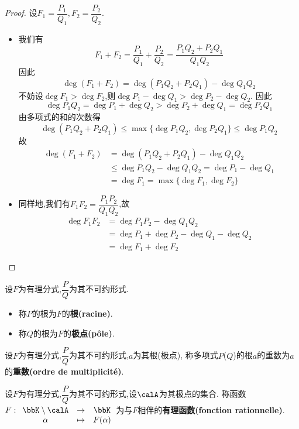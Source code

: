 \begin{proof}
    设$F_1 = \dfrac{P_1}{Q_1}, F_2 = \dfrac{P_2}{Q_2}$.
    \begin{itemize}
        \item 我们有\[ F_1 + F_2 = \dfrac{P_1}{Q_1} + \dfrac{P_2}{Q_2} = \dfrac{P_1Q_2 + P_2Q_1}{Q_1Q_2} \]
            因此\[ \deg (F_1 + F_2) = \deg (P_1Q_2 + P_2Q_1) - \deg Q_1Q_2 \]
            不妨设$\deg F_1 > \deg F_2$,则$\deg P_1 - \deg Q_1 > \deg P_2 - \deg Q_2$.
            因此\[ \deg P_1Q_2 = \deg P_1 + \deg Q_2 > \deg P_2 + \deg Q_1 = \deg P_2Q_1 \]
            由多项式的和的次数得\[ \deg (P_1Q_2 + P_2Q_1) \leqslant \max \{ \deg P_1Q_2, \deg P_2Q_1 \} \leqslant \deg P_1Q_2 \]
            故\begin{align*}
                \deg (F_1 + F_2) & =\deg (P_1Q_2 + P_2Q_1) - \deg Q_1Q_2 \\
                & \leqslant \deg P_1Q_2 - \deg Q_1Q_2 = \deg P_1 - \deg Q_1 \\
                & = \deg F_1 = \max \{ \deg F_1, \deg F_2 \}
            \end{align*}
        \item 同样地,我们有$F_1F_2 = \dfrac{P_1P_2}{Q_1Q_2}$,故
            \begin{align*}
                \deg F_1F_2 & = \deg P_1P_2 - \deg Q_1Q_2 \\
                & = \deg P_1 + \deg P_2 - \deg Q_1 - \deg Q_2 \\
                & = \deg F_1 + \deg F_2
            \end{align*}
    \end{itemize}
\end{proof}

\begin{deff}
    设$F$为有理分式,$\dfrac{P}{Q}$为其不可约形式.
    \begin{itemize}
        \item 称$P$的根为$F$的\textbf{根(racine)}.
        \item 称$Q$的根为$F$的\textbf{极点(pôle)}.
    \end{itemize}
\end{deff}

\begin{deff}
    设$F$为有理分式,$\dfrac{P}{Q}$为其不可约形式,$a$为其根(极点),
    称多项式$P$($Q$)的根$a$的重数为$a$的\textbf{重数(ordre de multiplicité)}.
\end{deff}

\begin{deff}
    设$F$为有理分式,$\dfrac{P}{Q}$为其不可约形式,设$\calA$为其极点的集合.
    称函数$F: \begin{array}[t]{ccc} \bbK \setminus \calA & \to & \bbK \\ \alpha & \tp &
    F(\alpha) \end{array}$为与$F$相伴的\textbf{有理函数(fonction rationnelle)}.
\end{deff}

